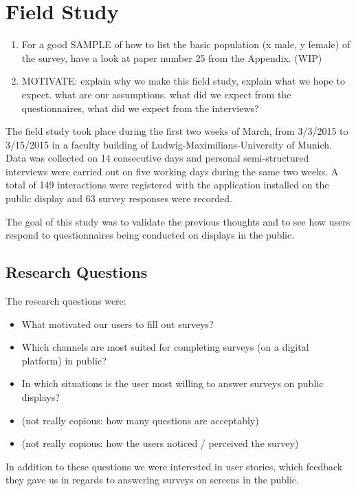 \section{Field Study}

	\begin{enumerate}
	\item For a good SAMPLE of how to list the basic population (x male, y female) of the survey, have a look at paper number 25 from the Appendix. (WIP)
	\item MOTIVATE: explain why we make this field study, explain what we hope to expect. what are our assumptions. what did we expect from the questionnaires, what did we expect from the interviews?
	\end{enumerate}


	The field study took place during the first two weeks of March, from 3/3/2015 to 3/15/2015 in a faculty building of Ludwig-Maximilians-University of Munich. Data was collected on 14 consecutive days and personal semi-structured interviews were carried out on five working days during the same two weeks. A total of 149 interactions were registered with the application installed on the public display and 63 survey responses were recorded.

	The goal of this study was to validate the previous thoughts and to see how users respond to questionnaires being conducted on displays in the public.



\subsection{Research Questions}

	The research questions were:

	\begin{itemize}
	\item What motivated our users to fill out surveys?
	\item Which channels are most suited for completing surveys (on a digital platform) in public?
	\item In which situations is the user most willing to answer surveys on public displays?
	\item (not really copious: how many questions are acceptably)
	\item (not really copious: how the users noticed / perceived the survey)
	\end{itemize}

	In addition to these questions we were interested in user stories, which feedback they gave us in regards to answering surveys on screens in the public.



